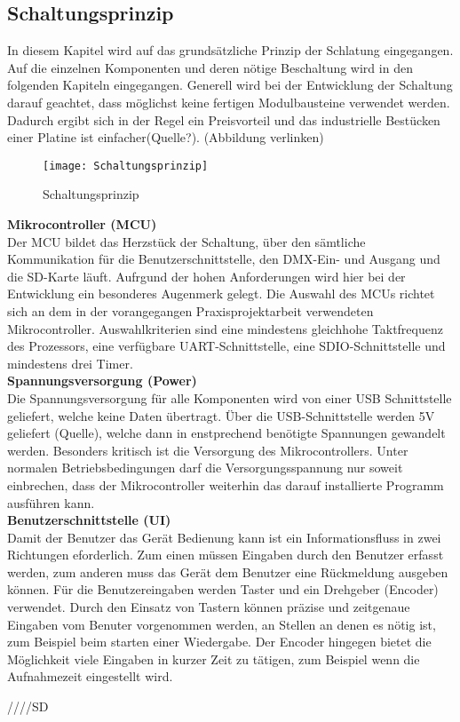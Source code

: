 
\subsection{Schaltungsprinzip}

In diesem Kapitel wird auf das grundsätzliche Prinzip der Schlatung eingegangen. Auf die einzelnen Komponenten und deren nötige Beschaltung wird in den folgenden Kapiteln eingegangen. Generell wird bei der Entwicklung der Schaltung darauf geachtet, dass möglichst keine fertigen Modulbausteine verwendet werden. Dadurch ergibt sich in der Regel ein Preisvorteil und das industrielle Bestücken einer Platine ist einfacher(Quelle?). (Abbildung verlinken)

\vspace*{5mm}
\begin{figure}[h]
	\texttt{[image: Schaltungsprinzip]}
	\caption{Schaltungsprinzip}
	\label{fig:Schaltungsrinzip}
\end{figure}
\hspace*{-5mm}\textbf{Mikrocontroller (MCU)}\\
Der MCU bildet das Herzstück der Schaltung, über den sämtliche Kommunikation für die Benutzerschnittstelle, den DMX-Ein- und Ausgang und die SD-Karte läuft. Aufrgund der hohen Anforderungen wird hier bei der Entwicklung ein besonderes Augenmerk gelegt. Die Auswahl des MCUs richtet sich an dem in der vorangegangen Praxisprojektarbeit verwendeten Mikrocontroller. Auswahlkriterien sind eine mindestens gleichhohe Taktfrequenz des Prozessors, eine verfügbare UART-Schnittstelle, eine SDIO-Schnittstelle und mindestens drei Timer.\\
\textbf{Spannungsversorgung (Power)}\\
Die Spannungsversorgung für alle Komponenten wird von einer USB Schnittstelle geliefert, welche keine Daten übertragt. Über die USB-Schnittstelle werden 5V geliefert (Quelle), welche dann in enstprechend benötigte Spannungen gewandelt werden. Besonders kritisch ist die Versorgung des Mikrocontrollers. Unter normalen Betriebsbedingungen darf die Versorgungsspannung nur soweit einbrechen, dass der Mikrocontroller weiterhin das darauf installierte Programm ausführen kann.\\
\textbf{Benutzerschnittstelle (UI)}\\
Damit der Benutzer das Gerät Bedienung kann ist ein Informationsfluss in zwei Richtungen eforderlich. Zum einen müssen Eingaben durch den Benutzer erfasst werden, zum anderen muss das Gerät dem Benutzer eine Rückmeldung ausgeben können. Für die Benutzereingaben werden Taster und ein Drehgeber (Encoder) verwendet. Durch den Einsatz von Tastern können präzise und zeitgenaue Eingaben vom Benuter vorgenommen werden, an Stellen an denen es nötig ist, zum Beispiel beim starten einer Wiedergabe. Der Encoder hingegen bietet die Möglichkeit viele Eingaben in kurzer Zeit zu tätigen, zum Beispiel wenn die Aufnahmezeit eingestellt wird.

////SD